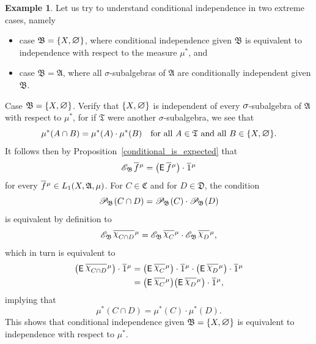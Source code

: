 \documentclass[
twoside=true,
paper=letter,
fontsize=9pt,
pagesize=auto,
leqno,
openany,
headsepline,
overfullrule,
]{scrbook}
\theoremstyle{plain}
\theoremstyle{plain}
\theoremstyle{definition}
\newtheorem{example}[thm]{Example}
\theoremstyle{bfnoteitalic}
\theoremstyle{bfnoteroman}
\newcommand{\sigalg}[1]{\mathfrak{#1}}
\newcommand{\cali}[1]{\mathscr{#1}}
\newcommand{\sfop}[1]{\mathsf{#1}}
\newcommand{\expval}{\sfop{E}\,}
\newcommand{\condexpsub}[2]
{\mathop{\cali{E}\hspace{-1.5pt}}\nolimits_{#2}\hspace{-1pt}#1}
\newcommand{\condprobsub}[2]
{\mathop{\cali{P}\hspace{-1.5pt}}\nolimits_{#2}\hspace{-1pt}\left(#1\right)}
\newcommand{\textsigma}{\hbox{\large{$\sigma$}}\kern-1pt}
\newcommand{\charfunction}[1]{\mathop{{\raisebox{2pt}{$\chi$}}_{#1}}}
\newcommand{\mtset}{\hbox{\large{$\varnothing$}}}
\newcommand{\meets}{\cap}
\newcommand{\sigmaalgebra}{\sigalg{A}}
\newcommand{\sigmaalgebraii}{\sigalg{B}}
\newcommand{\sigmaalgebraiii}{\sigalg{C}}
\newcommand{\sigmaalgebraiv}{\sigalg{D}}
\newcommand{\function}{f}
\newcommand{\measurespace}{X}
\newcommand{\measure}{\mu}
\newcommand{\seti}{A}
\newcommand{\setii}{B}
\newcommand{\setiii}{C}
\newcommand{\setiv}{D}
\newcommand*\xbar[1]{%
   \hbox{%
     \vbox{%
       \hrule height 0.4pt %
       \kern0.4ex%
       \hbox{%
         \ensuremath{#1}%
       }%
     }%
   }%
}
\newcommand{\lebclass}[1]{\hspace{.5pt}\xbar{#1}\hspace{0.5pt}}
\newcommand{\ellclass}[2]{\lebclass{#1}^{#2}}
\begin{document}
\begin{example}
Let us try to understand conditional independence in two extreme cases, namely
\begin{itemize}
\item
case
$\sigmaalgebraii
=
\{\measurespace, \mtset\}$,
where conditional independence given
$\sigmaalgebraii$ is equivalent to independence with respect to the  measure $\measure^*$, and
\item
case
$\sigmaalgebraii
=
\sigmaalgebra$,
where all \textsigma\hyp{}subalgebras of $\sigmaalgebra$ are conditionally independent given
$\sigmaalgebraii$.
\end{itemize}

Case
$\sigmaalgebraii
=
\{\measurespace, \mtset\}$.
Verify that $\{\measurespace, \mtset\}$ is independent of every
$\textsigma$\hyp{}subalgebra of $\sigmaalgebra$ with respect to
$\measure^*$, for if $\sigalg{T}$ were another \textsigma\hyp{}subalgebra, we see that
\[
\measure^*(\seti\meets\setii)
=
\measure^*(\seti) \cdot \measure^*(\setii)
\quad
\text{for all $\seti\in \sigalg{T}$ and all $\setii\in \{\measurespace, \mtset\}$.}
\]
It follows then by Proposition~\ref{conditional_is_expected} that
\[
\condexpsub{\ellclass{\function}{\measure}}{\sigmaalgebraii}
=
\bigl(\expval{\ellclass{\function}{\measure}}\bigr)
\cdot \ellclass{1}{\measure}
\]
for every
$\ellclass{\function}{\measure}\in L_1(\measurespace, \sigmaalgebra,\measure)$.
For
$\setiii\in\sigmaalgebraiii$ and for $\setiv\in\sigmaalgebraiv$,
the condition
\[
\condprobsub{\setiii\meets\setiv}{\sigmaalgebraii}
=
\condprobsub{\setiii}{\sigmaalgebraii}
\cdot
\condprobsub{\setiv}{\sigmaalgebraii}
\]
is equivalent by definition to
\[
\condexpsub{\ellclass{\charfunction{\setiii\meets\setiv}}{\measure}}{\sigmaalgebraii}
=
\condexpsub{\ellclass{\charfunction{\setiii}}{\measure}}{\sigmaalgebraii}
\cdot
\condexpsub{\ellclass{\charfunction{\setiv}}{\measure}}{\sigmaalgebraii},
\]
which in turn is equivalent to
\begin{align*}
\bigl(\expval{\ellclass{\charfunction{\setiii\meets\setiv}}{\measure}}\bigr)
\cdot \ellclass{1}{\measure}
& =
\bigl(\expval{\ellclass{\charfunction{\setiii}}{\measure}}\bigr)
\cdot \ellclass{1}{\measure}
\cdot
\bigl(\expval{\ellclass{\charfunction{\setiv}}{\measure}}\bigr)
\cdot \ellclass{1}{\measure} \\
& =
\bigl(\expval{\ellclass{\charfunction{\setiii}}{\measure}}\bigr)
\bigl(\expval{\ellclass{\charfunction{\setiv}}{\measure}}\bigr)
\cdot \ellclass{1}{\measure},\\
\end{align*}
implying that
\[
\measure^*(\setiii\meets\setiv) = \measure^*(\setiii)\cdot\measure^*(\setiv).
\]
This shows that conditional independence given
$\sigmaalgebraii = \{\measurespace, \mtset\}$ is equivalent to independence with respect to
$\measure^*$.



\end{example}
\end{document}
